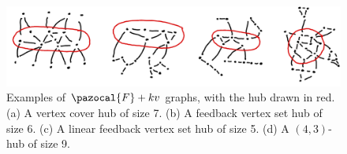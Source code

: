 \begin{figure}
    \includegraphics[width=\textwidth]{figures/fkv-graph-example.png}
    \caption{Examples of $\pazocal{F} + kv$ graphs, with the hub drawn in red. (a) A vertex cover hub of size 7. (b) A feedback vertex set hub of size 6. (c) A linear feedback vertex set hub of size 5. (d) A $(4, 3)$-hub of size 9. }
    \label{fig:fkv-graph-example}
\end{figure}